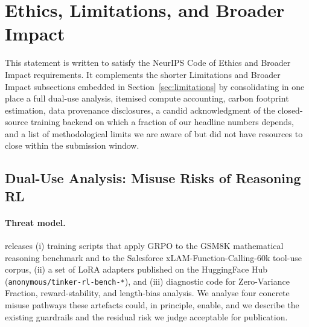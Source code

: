 
\section{Ethics, Limitations, and Broader Impact}
\label{sec:impact_standalone}

This statement is written to satisfy the NeurIPS Code of Ethics and Broader
Impact requirements. It complements the shorter Limitations and Broader
Impact subsections embedded in Section~\ref{sec:limitations} by consolidating
in one place a full dual-use analysis, itemised compute accounting, carbon
footprint estimation, data provenance disclosures, a candid acknowledgment
of the closed-source training backend on which a fraction of our headline
numbers depends, and a list of methodological limits we are aware of but
did not have resources to close within the submission window.

\subsection{Dual-Use Analysis: Misuse Risks of Reasoning RL}
\label{sec:dualuse}

\paragraph{Threat model.}
\ours{} releases (i) training scripts that apply GRPO to the GSM8K
\cite{cobbe2021training} mathematical reasoning benchmark and to the
Salesforce xLAM-Function-Calling-60k \cite{liu2024xlam} tool-use corpus,
(ii) a set of LoRA adapters published on the HuggingFace Hub
(\texttt{anonymous/tinker-rl-bench-*}), and (iii) diagnostic code for
Zero-Variance Fraction, reward-stability, and length-bias analysis. We
analyse four concrete misuse pathways these artefacts could, in principle,
enable, and we describe the existing guardrails and the residual risk we
judge acceptable for publication.


